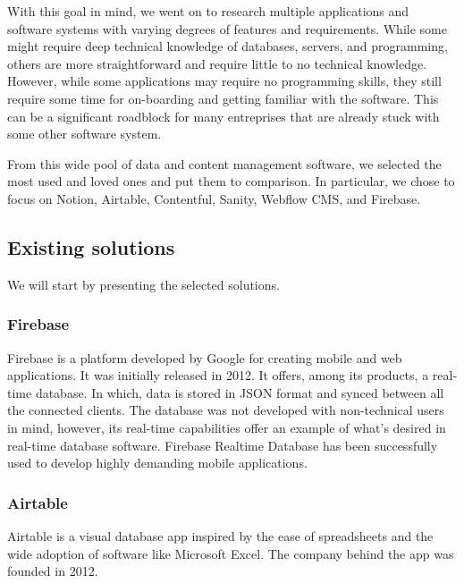 With this goal in mind, we went on to research multiple applications and software systems with varying degrees of features and requirements.
While some might require deep technical knowledge of databases, servers, and programming, others are more straightforward and require little to no technical knowledge.
However, while some applications may require no programming skills, they still require some time for on-boarding and getting familiar with the software.
This can be a significant roadblock for many entreprises that are already stuck with some other software system.

From this wide pool of data and content management software, we selected the most used and loved ones and put them to comparison. In particular, we chose to focus on Notion, Airtable, Contentful, Sanity, Webflow CMS, and Firebase.

\subsection{Existing solutions}

We will start by presenting the selected solutions.

\subsubsection{Firebase}


Firebase is a platform developed by Google for creating mobile and web
applications. It was initially released in 2012. It offers, among its
products, a real-time database. In which, data is stored in JSON format
and synced between all the connected clients. The database was not
developed with non-technical users in mind, however, its real-time
capabilities offer an example of what's desired in real-time database
software. Firebase Realtime Database has been successfully used to
develop highly demanding mobile applications.

\subsubsection{Airtable}


Airtable is a visual database app inspired by the ease of spreadsheets
and the wide adoption of software like Microsoft Excel. The company
behind the app was founded in 2012.

